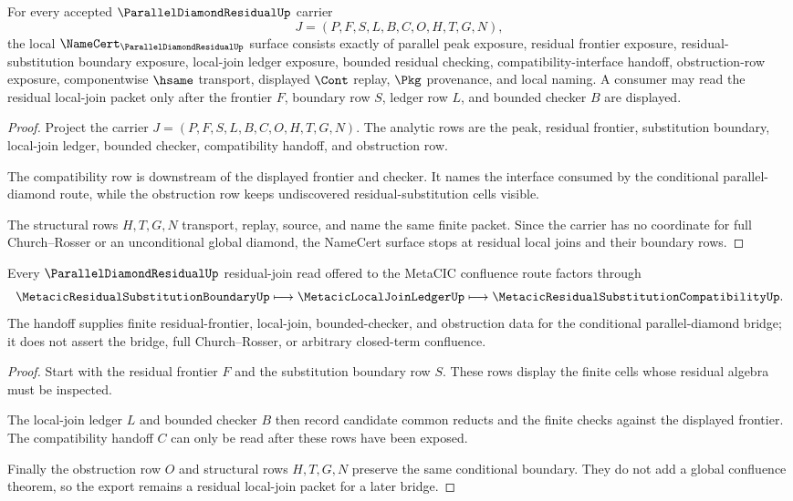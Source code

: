 \begin{theorem}
\label{thm:parallel-diamond-residual-namecert-obligations}
For every accepted $\ParallelDiamondResidualUp$ carrier
$$
J=(P,F,S,L,B,C,O,H,T,G,N),
$$
the local $\NameCert_{\ParallelDiamondResidualUp}$ surface consists exactly of parallel peak exposure, residual frontier exposure, residual-substitution boundary exposure, local-join ledger exposure, bounded residual checking, compatibility-interface handoff, obstruction-row exposure, componentwise $\hsame$ transport, displayed $\Cont$ replay, $\Pkg$ provenance, and local naming. A consumer may read the residual local-join packet only after the frontier $F$, boundary row $S$, ledger row $L$, and bounded checker $B$ are displayed.
\end{theorem}
\begin{proof}
Project the carrier $J=(P,F,S,L,B,C,O,H,T,G,N)$. The analytic rows are the peak, residual frontier, substitution boundary, local-join ledger, bounded checker, compatibility handoff, and obstruction row.

The compatibility row is downstream of the displayed frontier and checker. It names the interface consumed by the conditional parallel-diamond route, while the obstruction row keeps undiscovered residual-substitution cells visible.

The structural rows $H,T,G,N$ transport, replay, source, and name the same finite packet. Since the carrier has no coordinate for full Church--Rosser or an unconditional global diamond, the NameCert surface stops at residual local joins and their boundary rows.
\end{proof}

\begin{theorem}
\label{thm:parallel-diamond-residual-conditional-handoff}
Every $\ParallelDiamondResidualUp$ residual-join read offered to the MetaCIC confluence route factors through
$$
\MetacicResidualSubstitutionBoundaryUp \longmapsto \MetacicLocalJoinLedgerUp \longmapsto \MetacicResidualSubstitutionCompatibilityUp .
$$
The handoff supplies finite residual-frontier, local-join, bounded-checker, and obstruction data for the conditional parallel-diamond bridge; it does not assert the bridge, full Church--Rosser, or arbitrary closed-term confluence.
\end{theorem}
\begin{proof}
Start with the residual frontier $F$ and the substitution boundary row $S$. These rows display the finite cells whose residual algebra must be inspected.

The local-join ledger $L$ and bounded checker $B$ then record candidate common reducts and the finite checks against the displayed frontier. The compatibility handoff $C$ can only be read after these rows have been exposed.

Finally the obstruction row $O$ and structural rows $H,T,G,N$ preserve the same conditional boundary. They do not add a global confluence theorem, so the export remains a residual local-join packet for a later bridge.
\end{proof}

